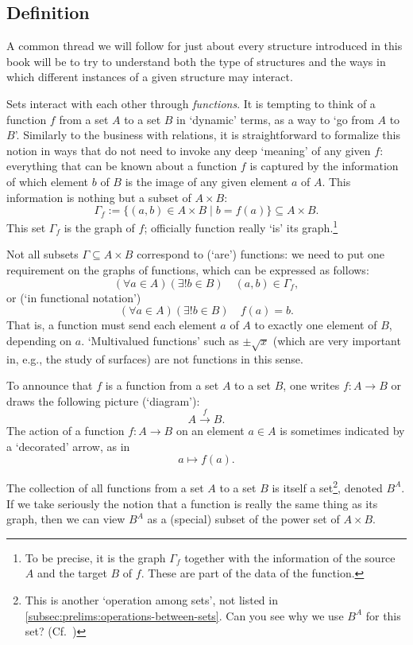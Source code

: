 \subsection{Definition}%
\label{subsec:prelims:functions:definition}
A common thread we will follow for just about every structure
introduced in this book will be to try to understand both the type of
structures and the ways in which different instances of a given
structure may interact.



Sets interact with each other through \emph{functions}. It is tempting
to think of a function $f$ from a set $A$ to a set $B$ in `dynamic'
terms, as a way to `go from $A$ to $B$'. Similarly to the business
with relations, it is straightforward to formalize this notion in ways
that do not need to invoke any deep `meaning' of any given $f$:
everything that can be known about a function $f$ is captured by the
information of which element $b$ of $B$ is the image of any given
element $a$ of $A$. This information is nothing but a subset of
$A \times B$:
\[\Gamma_f := \{(a, b) \in A \times B \mid b = f(a)\}
  \subseteq A \times B.\] This set $\Gamma_f$ is the graph of $f$;
officially function really `is' its graph.\footnote{To be precise, it
  is the graph $\Gamma_f$ together with the information of the source
  $A$ and the target $B$ of $f$. These are part of the data of the
  function.}

Not all subsets $\Gamma \subseteq A \times B$ correspond to (`are')
functions: we need to put one requirement on the graphs of functions,
which can be expressed as follows:
\[(\forall a \in A) (\exists !b \in B)\quad (a, b) \in \Gamma_f,\] or
(`in functional notation')
\[(\forall a \in A) (\exists !b \in B)\quad f(a) = b.\] That is, a
function must send each element $a$ of $A$ to exactly one element of
$B$, depending on $a$. `Multivalued functions' such as $\pm \sqrt{x}$
(which are very important in, e.g., the study of 
surfaces) are not functions in this sense.

To announce that $f$ is a function from a set $A$ to a set $B$, one
writes $f : A \to B$ or draws the following picture (`diagram'):
\[A \overset{f}{\to} B.\] The action of a function $f : A \to B$ on an
element $a \in A$ is sometimes indicated by a `decorated' arrow, as in
\[a \mapsto f(a).\]

The collection of all functions from a set $A$ to a set $B$ is itself
a set\footnote{This is another `operation among sets', not listed in
  \cref{subsec:prelims:operations-between-sets}. Can you see why we
  use $B^A$ for this set?
  (Cf.~)}, denoted $B^A$. If we
take seriously the notion that a function is really the same thing as
its graph, then we can view $B^A$ as a (special) subset of the power
set of $A \times B$.

